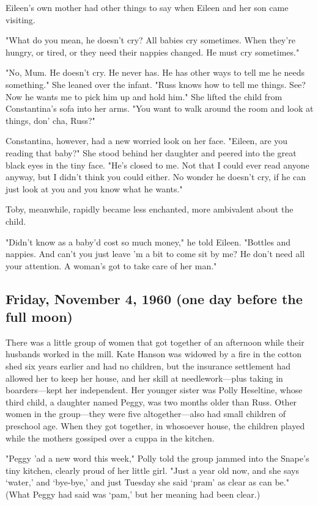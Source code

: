 Eileen's own mother had other things to say when Eileen and her son came visiting.

"What do you mean, he doesn't cry? All babies cry sometimes. When they're hungry, or tired, or they need their nappies changed. He must cry sometimes."

"No, Mum. He doesn't cry. He never has. He has other ways to tell me he needs something." She leaned over the infant. "Russ knows how to tell me things. See? Now he wants me to pick him up and hold him." She lifted the child from Constantina's sofa into her arms. "You want to walk around the room and look at things, don' cha, Russ?"

Constantina, however, had a new worried look on her face. "Eileen, are you reading that baby?" She stood behind her daughter and peered into the great black eyes in the tiny face. "He's closed to me. Not that I could ever read anyone anyway, but I didn't think you could either. No wonder he doesn't cry, if he can just look at you and you know what he wants."

Toby, meanwhile, rapidly became less enchanted, more ambivalent about the child.

"Didn't know as a baby'd cost so much money," he told Eileen. "Bottles and nappies. And can't you just leave 'm a bit to come sit by me? He don't need all your attention. A woman's got to take care of her man."

\subsection{Friday, November 4, 1960 (one day before the full moon)}

There was a little group of women that got together of an afternoon while their husbands worked in the mill. Kate Hanson was widowed by a fire in the cotton shed six years earlier and had no children, but the insurance settlement had allowed her to keep her house, and her skill at needlework—plus taking in boarders—kept her independent. Her younger sister was Polly Heseltine, whose third child, a daughter named Peggy, was two months older than Russ. Other women in the group—they were five altogether—also had small children of preschool age. When they got together, in whosoever house, the children played while the mothers gossiped over a cuppa in the kitchen.

"Peggy 'ad a new word this week," Polly told the group jammed into the Snape's tiny kitchen, clearly proud of her little girl. "Just a year old now, and she says `water,' and `bye-bye,' and just Tuesday she said `pram' as clear as can be." (What Peggy had said was `pam,' but her meaning had been clear.)

